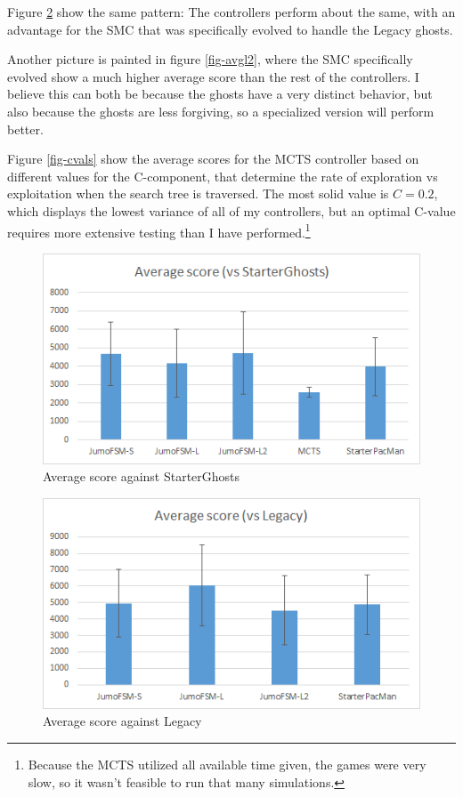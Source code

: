 \documentclass[conference]{IEEEtran}
\begin{document}
Figure \ref{fig-avgl} show the same pattern: The controllers perform about the same, with an advantage for the SMC that was specifically evolved to handle the Legacy ghosts.

Another picture is painted in figure \ref{fig-avgl2}, where the SMC specifically evolved show a much higher average score than the rest of the controllers. I believe this can both be because the ghosts have a very distinct behavior, but also because the ghosts are less forgiving, so a specialized version will perform better.

Figure \ref{fig-cvals} show the average scores for the MCTS controller based on different values for the C-component, that determine the rate of exploration vs exploitation when the search tree is traversed. The most solid value is $C = 0.2$, which displays the lowest variance of all of my controllers, but an optimal C-value requires more extensive testing than I have performed.\footnote{Because the MCTS utilized all available time given, the games were very slow, so it wasn't feasible to run that many simulations.}

\begin{figure}[htp]
\centerline{\includegraphics[width=0.9\columnwidth]{average_starter.png}}
\caption{Average score against StarterGhosts}
\label{fig-avgs}
\end{figure}

\begin{figure}[htp]
\centerline{\includegraphics[width=0.9\columnwidth]{average_legacy.png}}
\caption{Average score against Legacy}
\label{fig-avgl}
\end{figure}
\end{document}
